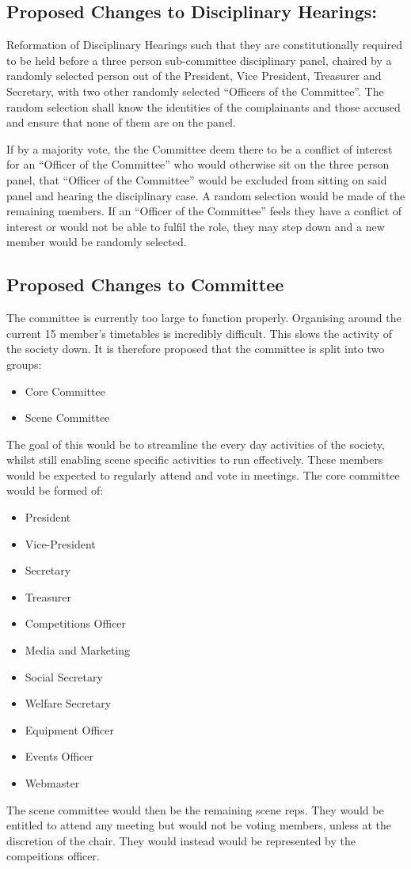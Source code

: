 \documentclass[10pt, a4paper]{article}
\begin{document}
\subsection{Proposed Changes to Disciplinary Hearings:}
Reformation of Disciplinary Hearings such that they are constitutionally required to be held before a three person sub-committee disciplinary panel, chaired by a randomly selected person out of the President, Vice President, Treasurer and Secretary, with two other randomly selected ``Officers of the Committee''. The random selection shall know the identities of the complainants and those accused and ensure that none of them are on the panel. 

If by a majority vote, the the Committee deem there to be a conflict of interest for an ``Officer of the Committee'' who would otherwise sit on the three person panel, that ``Officer of the Committee'' would be excluded from sitting on said panel and hearing the disciplinary case. A random selection would be made of the remaining members. If an ``Officer of the Committee'' feels they have a conflict of interest or would not be able to fulfil the role, they may step down and a new member would be randomly selected.

\subsection{Proposed Changes to Committee}
The committee is currently too large to function properly. Organising around the current 15 member's timetables is incredibly difficult. This slows the activity of the society down. It is therefore proposed that the committee is split into two groups:

\begin{itemize}
    \item Core Committee
    \item Scene Committee
\end{itemize}

The goal of this would be to streamline the every day activities of the society, whilst still enabling scene specific activities to run effectively. These members would be expected to regularly attend and vote in meetings. The core committee would be formed of:
\begin{itemize}
    \item President
    \item Vice-President
    \item Secretary
    \item Treasurer
    \item Competitions Officer
    \item Media and Marketing
    \item Social Secretary
    \item Welfare Secretary
    \item Equipment Officer
    \item Events Officer
    \item Webmaster
\end{itemize}

The scene committee would then be the remaining scene reps. They would be entitled to attend any meeting but would not be voting members, unless at the discretion of the chair. They would instead would be represented by the compeitions officer.
\end{document}
